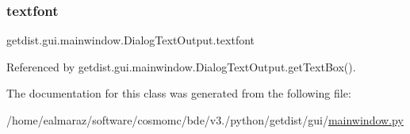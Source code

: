 \mbox{\label{classgetdist_1_1gui_1_1mainwindow_1_1DialogTextOutput_a69ffc7aa6ccad27e432f722f222336c6}} 
\subsubsection{\texorpdfstring{textfont}{textfont}}
{\footnotesize\ttfamily getdist.\+gui.\+mainwindow.\+Dialog\+Text\+Output.\+textfont}



Referenced by getdist.\+gui.\+mainwindow.\+Dialog\+Text\+Output.\+get\+Text\+Box().



The documentation for this class was generated from the following file\+:\begin{DoxyCompactItemize}
\item 
/home/ealmaraz/software/cosmomc/bde/v3./python/getdist/gui/\mbox{\hyperlink{mainwindow_8py}{mainwindow.\+py}}\end{DoxyCompactItemize}
